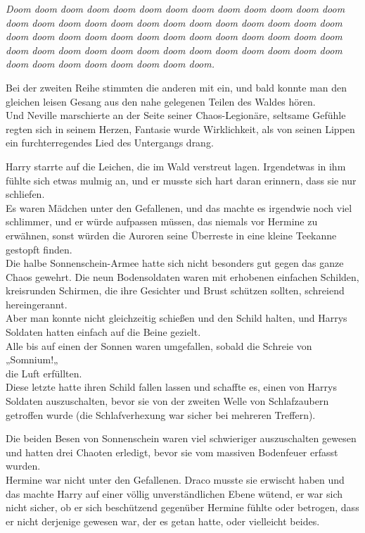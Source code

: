 {\emph{Doom doom doom doom doom doom doom doom doom doom doom doom doom doom doom doom doom doom doom doom doom doom doom doom doom doom doom doom doom doom doom doom doom doom doom doom doom doom doom doom doom doom doom doom doom doom doom doom doom doom doom doom doom doom doom doom doom doom doom doom.}

Bei der zweiten Reihe stimmten die anderen mit ein, und bald konnte man den gleichen leisen Gesang aus den nahe gelegenen Teilen des Waldes hören.\\ Und Neville marschierte an der Seite seiner Chaos-Legionäre, seltsame Gefühle regten sich in seinem Herzen, Fantasie wurde Wirklichkeit, als von seinen Lippen ein furchterregendes Lied des Untergangs drang.

Harry starrte auf die Leichen, die im Wald verstreut lagen. Irgendetwas in ihm fühlte sich etwas mulmig an, und er musste sich hart daran erinnern, dass sie nur schliefen.\\ Es waren Mädchen unter den Gefallenen, und das machte es irgendwie noch viel schlimmer, und er würde aufpassen müssen, das niemals vor Hermine zu erwähnen, sonst würden die Auroren seine Überreste in eine kleine Teekanne gestopft finden.\\ Die halbe Sonnenschein-Armee hatte sich nicht besonders gut gegen das ganze Chaos gewehrt. Die neun Bodensoldaten waren mit erhobenen einfachen Schilden, kreisrunden Schirmen, die ihre Gesichter und Brust schützen sollten, schreiend hereingerannt.\\ Aber man konnte nicht gleichzeitig schießen und den Schild halten, und Harrys Soldaten hatten einfach auf die Beine gezielt.\\ Alle bis auf einen der Sonnen waren umgefallen, sobald die Schreie von „Somnium!„\\ die Luft erfüllten.\\ Diese letzte hatte ihren Schild fallen lassen und schaffte es, einen von Harrys Soldaten auszuschalten, bevor sie von der zweiten Welle von Schlafzaubern getroffen wurde (die Schlafverhexung war sicher bei mehreren Treffern).

Die beiden Besen von Sonnenschein waren viel schwieriger auszuschalten gewesen und hatten drei Chaoten erledigt, bevor sie vom massiven Bodenfeuer erfasst wurden.\\ Hermine war nicht unter den Gefallenen. Draco musste sie erwischt haben und das machte Harry auf einer völlig unverständlichen Ebene wütend, er war sich nicht sicher, ob er sich beschützend gegenüber Hermine fühlte oder betrogen, dass er nicht derjenige gewesen war, der es getan hatte, oder vielleicht beides.

}
